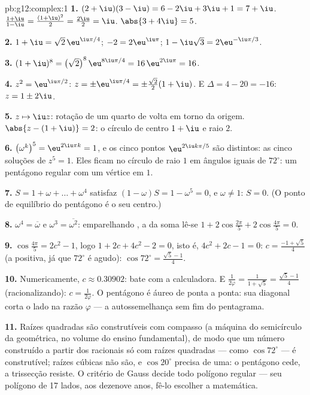\begin{solution}{pb:g12:complex:1}
\textbf{1.} $(2 + \iu)(3 - \iu) = 6 - 2\iu + 3\iu + 1 =
7 + \iu$. \quad $\frac{1 + \iu}{1 - \iu} =
\frac{(1 + \iu)^2}{2} = \frac{2\iu}{2} = \iu$. \quad
$\abs{3 + 4\iu} = 5$.

\textbf{2.} $1 + \iu = \sqrt2\,\eu^{\iu\pi/4}$;
$-2 = 2\eu^{\iu\pi}$; $1 - \iu\sqrt3 = 2\eu^{-\iu\pi/3}$.

\textbf{3.} $(1 + \iu)^8 = \left(\sqrt2\right)^8
\eu^{8\iu\pi/4} = 16\,\eu^{2\iu\pi} = 16$.

\textbf{4.} $z^2 = \eu^{\iu\pi/2}$:
$z = \pm\eu^{\iu\pi/4} = \pm\frac{\sqrt2}{2}(1 + \iu)$. E
$\Delta = 4 - 20 = -16$: $z = 1 \pm 2\iu$.

\textbf{5.} $z \mapsto \iu z$: rotação de um quarto de volta em
torno da origem. $\abs{z - (1 + \iu)} = 2$: o círculo de centro
$1 + \iu$ e raio $2$.

\textbf{6.} $\left(\omega^k\right)^5 = \eu^{2\iu\pi k} = 1$, e
os cinco pontos $\eu^{2\iu k\pi/5}$ são distintos: as cinco
soluções de $z^5 = 1$. Eles ficam no círculo de raio $1$ em
ângulos iguais de $72^\circ$: um pentágono regular com um
vértice em $1$.

\textbf{7.} $S = 1 + \omega + \dots + \omega^4$ satisfaz
$(1 - \omega)S = 1 - \omega^5 = 0$, e $\omega \neq 1$:
$S = 0$. (O ponto de equilíbrio do pentágono é o seu centro.)

\textbf{8.} $\omega^4 = \overline\omega$ e
$\omega^3 = \overline{\omega^2}$: emparelhando , a
 da soma lê-se
$1 + 2\cos\frac{2\pi}{5} + 2\cos\frac{4\pi}{5} = 0$.

\textbf{9.} $\cos\frac{4\pi}{5} = 2c^2 - 1$, logo
$1 + 2c + 4c^2 - 2 = 0$, isto é, $4c^2 + 2c - 1 = 0$:
$c = \frac{-1 + \sqrt5}{4}$ (a  positiva, já que $72^\circ$
é agudo): $\cos 72^\circ = \frac{\sqrt5 - 1}{4}$.

\textbf{10.} Numericamente, $c \approx 0.30902$: bate com a
calculadora. E $\frac{1}{2\varphi} = \frac{1}{1 + \sqrt5} =
\frac{\sqrt5 - 1}{4}$ (racionalizando): $c = \frac{1}{2\varphi}$.
O pentágono é áureo de ponta a ponta: sua diagonal corta o lado
na razão $\varphi$ --- a autossemelhança sem fim do pentagrama.

\textbf{11.} Raízes quadradas são construtíveis com compasso (a
máquina do semicírculo da  geométrica, no volume do ensino
fundamental), de modo que um número construído a partir dos
racionais só com raízes quadradas --- como $\cos 72^\circ$ ---
é construtível; raízes cúbicas não são, e $\cos 20^\circ$
precisa de uma: o pentágono cede, a trissecção resiste. O
critério de Gauss decide todo polígono regular --- seu polígono
de 17 lados, aos dezenove anos, fê-lo escolher a matemática.


\end{solution}
